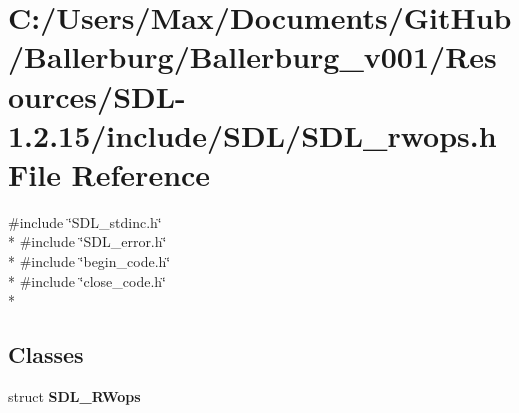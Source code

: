 \section{C\+:/\+Users/\+Max/\+Documents/\+Git\+Hub/\+Ballerburg/\+Ballerburg\+\_\+v001/\+Resources/\+S\+D\+L-\/1.2.15/include/\+S\+D\+L/\+S\+D\+L\+\_\+rwops.h File Reference}
\label{_s_d_l__rwops_8h}
{\ttfamily \#include \char`\"{}S\+D\+L\+\_\+stdinc.\+h\char`\"{}}\\*
{\ttfamily \#include \char`\"{}S\+D\+L\+\_\+error.\+h\char`\"{}}\\*
{\ttfamily \#include \char`\"{}begin\+\_\+code.\+h\char`\"{}}\\*
{\ttfamily \#include \char`\"{}close\+\_\+code.\+h\char`\"{}}\\*
\subsection*{Classes}
\begin{DoxyCompactItemize}
\item 
struct {\bf S\+D\+L\+\_\+\+R\+Wops}
\end{DoxyCompactItemize}
